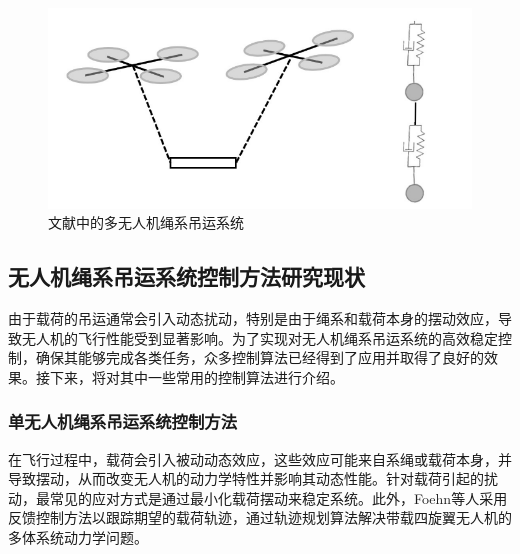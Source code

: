\documentclass[lang=chs, degree=master, blindreview=false, winfonts=true]{yanputhesis}
\begin{document}
\begin{figure}[hbt!]
	\centering
	\includegraphics[width=28pc]{picture/1_8.png} 
	\caption{文献中的多无人机绳系吊运系统} \label{1_8}
\end{figure}

\subsection{无人机绳系吊运系统控制方法研究现状}
由于载荷的吊运通常会引入动态扰动，特别是由于绳系和载荷本身的摆动效应，导致无人机的飞行性能受到显著影响。为了实现对无人机绳系吊运系统的高效稳定控制，确保其能够完成各类任务，众多控制算法已经得到了应用并取得了良好的效果。接下来，将对其中一些常用的控制算法进行介绍。
\subsubsection{单无人机绳系吊运系统控制方法}
在飞行过程中，载荷会引入被动动态效应，这些效应可能来自系绳或载荷本身，并导致摆动，从而改变无人机的动力学特性并影响其动态性能。针对载荷引起的扰动，最常见的应对方式是通过最小化载荷摆动来稳定系统\cite{lv2022finite,2019An}。此外，Foehn等人\cite{Foehn-RSS-17}采用反馈控制方法以跟踪期望的载荷轨迹，通过轨迹规划算法解决带载四旋翼无人机的多体系统动力学问题。

\end{document}
